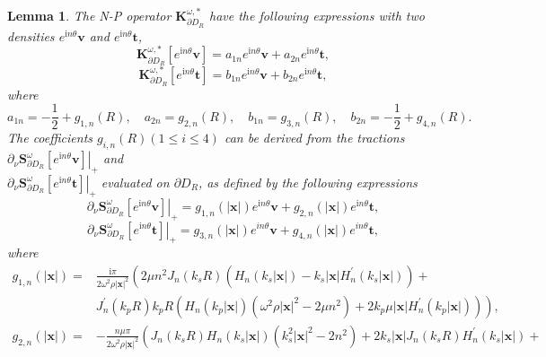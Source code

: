 \documentclass[10pt,reqno,oneside]{amsart}%
\newtheorem{lem}{Lemma}[section]
\theoremstyle{definition}
\theoremstyle{remark}
\numberwithin{equation}{section}
\numberwithin{equation}{section}
\begin{document}
\begin{lem}\label{Spectrum2}
The N-P operator $\mathbf{K}_{\partial D_{R}}^{\omega, *}$ have the following expressions with two densities $e^{\mathrm{i} n \theta} \boldsymbol{v}$ and $e^{\mathrm{i} n \theta} \boldsymbol{t}$,
$$
\mathbf{K}_{\partial D_{R}}^{\omega, *}\left[e^{\mathrm{i} n \theta} \boldsymbol{v}\right]=a_{1 n} e^{\mathrm{i} n \theta} \boldsymbol{v}+a_{2 n} e^{\mathrm{i} n \theta} \boldsymbol{t},
$$
$$
\mathbf{K}_{\partial D_{R}}^{\omega, *}\left[e^{\mathrm{i} n \theta} \boldsymbol{t}\right] =b_{1 n} e^{\mathrm{i} n \theta} \boldsymbol{v}+b_{2 n} e^{\mathrm{i} n \theta} \boldsymbol{t},
$$
where
$$
a_{1 n}=-\frac{1}{2}+g_{1, n}(R), \quad a_{2 n}=g_{2, n}(R), \quad b_{1 n}=g_{3, n}(R), \quad b_{2 n}=-\frac{1}{2}+g_{4, n}(R).
$$
The coefficients $g_{i, n}(R)(1 \leq i \leq 4)$ can be derived from the tractions $\left.\partial_{\nu} \mathbf{S}_{\partial D_{R}}^{\omega}\left[e^{\mathrm{i} n \theta} \boldsymbol{v}\right]\right|_{+}$ and \\
$\left.\partial_{\nu} \mathbf{S}_{\partial D_{R}}^{\omega}\left[e^{\mathrm{i} n \theta} \boldsymbol{t}\right]\right|_{+}$ evaluated on $\partial D_{R}$, as defined by the following expressions
$$
\left.\partial_{\nu} \mathbf{S}_{\partial D_{R}}^{\omega}\left[e^{\mathrm{i} n \theta} \boldsymbol{v}\right]\right|_{+}=g_{1, n}(|\mathbf{x}|) e^{\mathrm{i} n \theta} \boldsymbol{v}+g_{2, n}(|\mathbf{x}|) e^{\mathrm{i} n \theta} \boldsymbol{t},
$$
$$
\left.\partial_{\nu} \mathbf{S}_{\partial D_{R}}^{\omega}\left[e^{\mathrm{i} n \theta} \boldsymbol{t}\right]\right|_{+}=g_{3, n}(|\mathbf{x}|) e^{i n \theta} \boldsymbol{v}+g_{4, n}(|\mathbf{x}|) e^{i n \theta} \boldsymbol{t},
$$
where
\begin{equation}
\begin{aligned}
g_{1, n}(|\mathbf{x}|)= & \frac{\mathrm{i} \pi}{2 \omega^{2} \rho |\mathbf{x}|^{2}}\left(2 \mu n^{2} J_{n}\left(k_{s} R\right)\left(H_{n}\left(k_{s}|\mathbf{x}|\right)-k_{s} |\mathbf{x}| H_{n}^{\prime}\left(k_{s}|\mathbf{x}|\right)\right)+\right. \\
& \left.J_{n}^{\prime}\left(k_{p} R\right) k_{p} R\left(H_{n}\left(k_{p}|\mathbf{x}|\right)\left(\omega^{2} \rho |\mathbf{x}|^{2}-2 \mu n^{2}\right)+2 k_{p} \mu |\mathbf{x}| H_{n}^{\prime}\left(k_{p}|\mathbf{x}|\right)\right)\right),\nonumber
\end{aligned}
\end{equation}
\begin{equation}
\begin{aligned}
g_{2, n}(|\mathbf{x}|)= & -\frac{n \mu \pi}{2 \omega^{2} \rho |\mathbf{x}|^{2}}\left(J_{n}\left(k_{s} R\right) H_{n}\left(k_{s}|\mathbf{x}|\right)\left(k_{s}^{2} |\mathbf{x}|^{2}-2 n^{2}\right)+2k_{s}|\mathbf{x}| J_{n}\left(k_{s} R\right) H_{n}^{\prime}\left(k_{s}|\mathbf{x}|\right)+\right. \\

\end{aligned}
\end{equation}
\end{lem}
\end{document}
